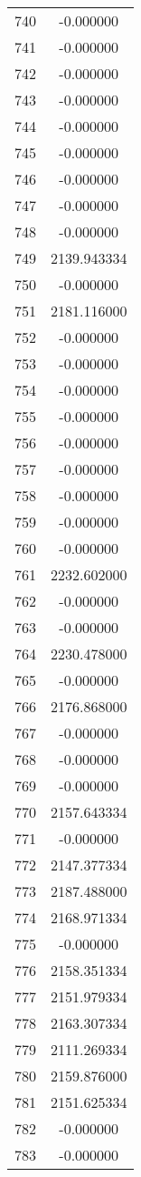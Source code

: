 \documentclass[12pt]{article}
\begin{document}
\begin{longtable}{@{}cc@{}}
740 & -0.000000 \\
741 & -0.000000 \\
742 & -0.000000 \\
743 & -0.000000 \\
744 & -0.000000 \\
745 & -0.000000 \\
746 & -0.000000 \\
747 & -0.000000 \\
748 & -0.000000 \\
749 & 2139.943334 \\
750 & -0.000000 \\
751 & 2181.116000 \\
752 & -0.000000 \\
753 & -0.000000 \\
754 & -0.000000 \\
755 & -0.000000 \\
756 & -0.000000 \\
757 & -0.000000 \\
758 & -0.000000 \\
759 & -0.000000 \\
760 & -0.000000 \\
761 & 2232.602000 \\
762 & -0.000000 \\
763 & -0.000000 \\
764 & 2230.478000 \\
765 & -0.000000 \\
766 & 2176.868000 \\
767 & -0.000000 \\
768 & -0.000000 \\
769 & -0.000000 \\
770 & 2157.643334 \\
771 & -0.000000 \\
772 & 2147.377334 \\
773 & 2187.488000 \\
774 & 2168.971334 \\
775 & -0.000000 \\
776 & 2158.351334 \\
777 & 2151.979334 \\
778 & 2163.307334 \\
779 & 2111.269334 \\
780 & 2159.876000 \\
781 & 2151.625334 \\
782 & -0.000000 \\
783 & -0.000000 \\

\end{longtable}
\end{document}
